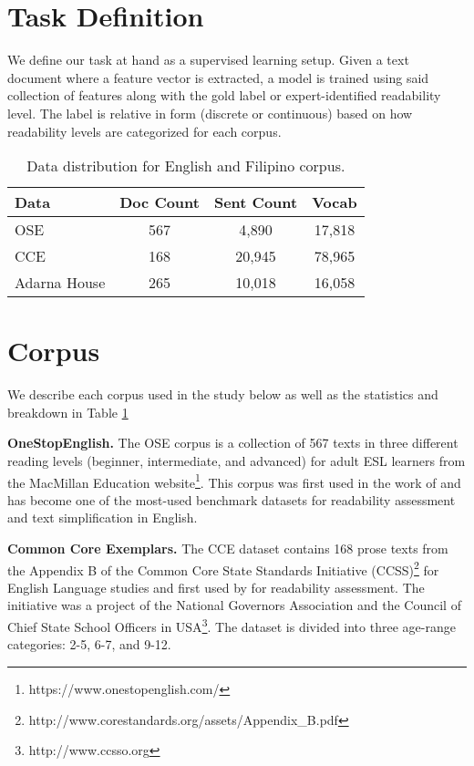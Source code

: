 \documentclass[11pt,a4paper]{article}
\begin{document}
\section{Task Definition}
We define our task at hand as a supervised learning setup. Given a text document  where a feature vector  is extracted, a model  is trained using said collection of features  along with the gold label  or expert-identified readability level. The label is relative in form (discrete or continuous) based on how readability levels are categorized for each corpus.




\begin{table}[!htbp]\small
\centering
\begin{tabular}{|l|c|c|c|}

\hline \bf Data & \bf Doc Count & \bf Sent Count &\bf  Vocab\\  \hline

OSE & 567 & 4,890 & 17,818\\ \hline
CCE & 168 & 20,945 & 78,965\\ \hline
Adarna House & 265 & 10,018 & 16,058\\ \hline

\end{tabular}
\caption{\label{tab:data}
Data distribution for English and Filipino corpus.}
\end{table}


\section{Corpus}
We describe each corpus used in the study below as well as the statistics and breakdown in Table \ref{tab:data}\linebreak


\noindent\textbf{OneStopEnglish.} The OSE corpus is a collection of 567 texts in three different reading levels (beginner, intermediate, and advanced) for adult ESL learners from the MacMillan Education website\footnote{https://www.onestopenglish.com/}. This corpus was first used in the work of \citet{vajjala-lucic-2018-onestopenglish} and has become one of the most-used benchmark datasets for readability assessment and text simplification in English.\linebreak


\noindent\textbf{Common Core Exemplars.} The CCE dataset contains 168 prose texts from the Appendix B of the Common Core State Standards Initiative (CCSS)\footnote{http://www.corestandards.org/assets/Appendix\_B.pdf} for English Language studies and first used by \citet{flor-etal-2013-lexical} for readability assessment. The initiative was a project of the National Governors Association and the Council of Chief State School Officers in USA\footnote{http://www.ccsso.org}. The dataset is divided into three age-range categories: 2-5, 6-7, and 9-12. \linebreak
\end{document}
